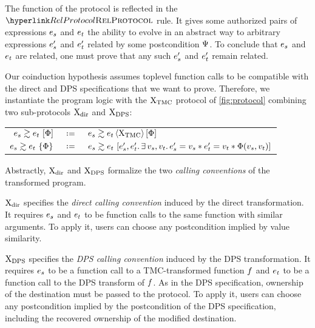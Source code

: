 The function of the protocol is reflected in the $\RefTirName{RelProtocol}$ rule.
It gives some authorized pairs of expressions $\datalangExpr_s$ and $\datalangExpr_t$ the ability to evolve in an abstract way to arbitrary expressions $\datalangExpr_s'$ and $\datalangExpr_t'$ related by some postcondition $\Psi$.
To conclude that $\datalangExpr_s$ and $\datalangExpr_t$ are related, one must prove that any such $\datalangExpr_s'$ and $\datalangExpr_t'$ remain related.

Our coinduction hypothesis assumes toplevel function calls to be compatible with the direct and DPS specifications that we want to prove.
Therefore, we instantiate the program logic with the $\mathrm{X}_\mathrm{TMC}$ protocol of \cref{fig:protocol} combining two sub-protocols $\mathrm{X}_\mathrm{dir}$ and $\mathrm{X}_\mathrm{DPS}$:

\medskip
\begin{tabular}{rcl}
        $\iSim{
            \iPred
        }{
            \datalangExpr_s
        }{
            \datalangExpr_t
        }$
        & $\coloneqq$ &
        $\iSim[
            \iProt_\mathrm{TMC}
        ]{
            \iPred
        }{
            \datalangExpr_s
        }{
            \datalangExpr_t
        }$
    \\
        $\iSimv{
            \iPred
        }{
            \datalangExpr_s
        }{
            \datalangExpr_t
        }$
        & $\coloneqq$ &
        $\iSim{
            \datalangExpr_s', \datalangExpr_t' \ldotp
            \exists \datalangVal_s, \datalangVal_t \ldotp
            \datalangExpr_s' = \datalangVal_s \iSep
            \datalangExpr_t' = \datalangVal_t \iSep
            \iPred (\datalangVal_s, \datalangVal_t)
        }{
            \datalangExpr_s
        }{
            \datalangExpr_t
        }$
\end{tabular}
\medskip

Abstractly, $\mathrm{X}_\mathrm{dir}$ and $\mathrm{X}_\mathrm{DPS}$ formalize the two \emph{calling conventions} of the transformed program.

$\mathrm{X}_\mathrm{dir}$ specifies the \emph{direct calling convention} induced by the direct transformation.
It requires $\datalangExpr_s$ and $\datalangExpr_t$ to be function calls to the same function with similar arguments.
To apply it, users can choose any postcondition implied by value similarity.

$\mathrm{X}_\mathrm{DPS}$ specifies the \emph{DPS calling convention} induced by the DPS transformation.
It requires $\datalangExpr_s$ to be a function call to a TMC-transformed function $\datalangFn$ and $\datalangExpr_t$ to be a function call to the DPS transform of $\datalangFn$.
As in the DPS specification, ownership of the destination must be passed to the protocol.
To apply it, users can choose any postcondition implied by the postcondition of the DPS specification, including the recovered ownership of the modified destination.

